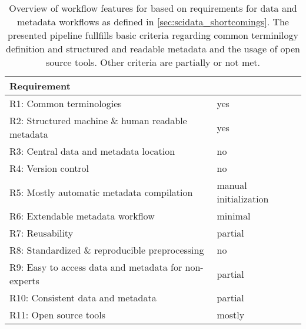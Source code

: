 \begin{table}[]
\begin{tabular}{|l|l|}
\hline
Requirement                                          &  \cite{Brochier_2018} \\  \hline
R1: Common terminologies                             &  yes \\ \hline
R2: Structured machine \& human readable metadata    &  yes \\ \hline
R3: Central data and metadata location               &  no \\ \hline
R4: Version control                                  &  no \\ \hline
R5: Mostly automatic metadata compilation            &  manual initialization \\ \hline
R6: Extendable metadata workflow                     &  minimal \\ \hline
R7: Reusability                                      &  partial \\ \hline
R8: Standardized \& reproducible preprocessing       &  no \\ \hline
R9: Easy to access data and metadata for non-experts &  partial \\ \hline
R10: Consistent data and metadata                    &  partial \\ \hline
R11: Open source tools                               &  mostly \\ \hline
\end{tabular}
\caption[Overview of workflow features for \cite{Brochier_2018}]{Overview of workflow features for \cite{Brochier_2018} based on requirements for data and metadata workflows as defined in \ref{sec:scidata_shortcomings}. The presented pipeline fullfills basic criteria regarding common terminilogy definition and structured and readable metadata and the usage of open source tools. Other criteria are partially or not met.}
\label{tab:requirement_check_scidata}
\end{table}



% 
